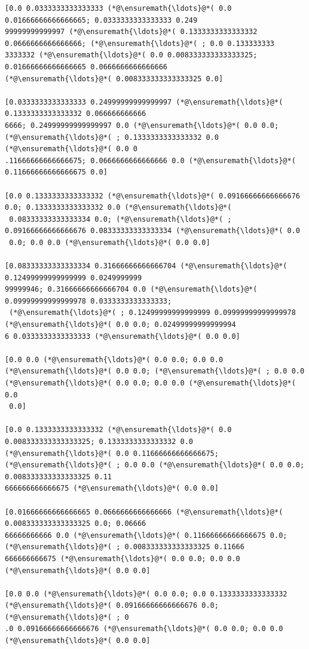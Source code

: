 \documentclass[12pt,a4paper]{article}
\begin{document}
\begin{lstlisting}
[0.0 0.0333333333333333 (*@\ensuremath{\ldots}@*( 0.0 0.01666666666666665; 0.0333333333333333 0.249
99999999999997 (*@\ensuremath{\ldots}@*( 0.1333333333333332 0.0666666666666666; (*@\ensuremath{\ldots}@*( ; 0.0 0.133333333
3333332 (*@\ensuremath{\ldots}@*( 0.0 0.008333333333333325; 0.01666666666666665 0.0666666666666666 
(*@\ensuremath{\ldots}@*( 0.008333333333333325 0.0]

[0.0333333333333333 0.24999999999999997 (*@\ensuremath{\ldots}@*( 0.1333333333333332 0.066666666666
6666; 0.24999999999999997 0.0 (*@\ensuremath{\ldots}@*( 0.0 0.0; (*@\ensuremath{\ldots}@*( ; 0.1333333333333332 0.0 (*@\ensuremath{\ldots}@*( 0.0 0
.11666666666666675; 0.0666666666666666 0.0 (*@\ensuremath{\ldots}@*( 0.11666666666666675 0.0]

[0.0 0.1333333333333332 (*@\ensuremath{\ldots}@*( 0.09166666666666676 0.0; 0.1333333333333332 0.0 (*@\ensuremath{\ldots}@*(
 0.08333333333333334 0.0; (*@\ensuremath{\ldots}@*( ; 0.09166666666666676 0.08333333333333334 (*@\ensuremath{\ldots}@*( 0.0
 0.0; 0.0 0.0 (*@\ensuremath{\ldots}@*( 0.0 0.0]

[0.08333333333333334 0.31666666666666704 (*@\ensuremath{\ldots}@*( 0.12499999999999999 0.0249999999
99999946; 0.31666666666666704 0.0 (*@\ensuremath{\ldots}@*( 0.09999999999999978 0.0333333333333333;
 (*@\ensuremath{\ldots}@*( ; 0.12499999999999999 0.09999999999999978 (*@\ensuremath{\ldots}@*( 0.0 0.0; 0.02499999999999994
6 0.0333333333333333 (*@\ensuremath{\ldots}@*( 0.0 0.0]

[0.0 0.0 (*@\ensuremath{\ldots}@*( 0.0 0.0; 0.0 0.0 (*@\ensuremath{\ldots}@*( 0.0 0.0; (*@\ensuremath{\ldots}@*( ; 0.0 0.0 (*@\ensuremath{\ldots}@*( 0.0 0.0; 0.0 0.0 (*@\ensuremath{\ldots}@*( 0.0
 0.0]

[0.0 0.1333333333333332 (*@\ensuremath{\ldots}@*( 0.0 0.008333333333333325; 0.1333333333333332 0.0 
(*@\ensuremath{\ldots}@*( 0.0 0.11666666666666675; (*@\ensuremath{\ldots}@*( ; 0.0 0.0 (*@\ensuremath{\ldots}@*( 0.0 0.0; 0.008333333333333325 0.11
666666666666675 (*@\ensuremath{\ldots}@*( 0.0 0.0]

[0.01666666666666665 0.0666666666666666 (*@\ensuremath{\ldots}@*( 0.008333333333333325 0.0; 0.06666
66666666666 0.0 (*@\ensuremath{\ldots}@*( 0.11666666666666675 0.0; (*@\ensuremath{\ldots}@*( ; 0.008333333333333325 0.11666
666666666675 (*@\ensuremath{\ldots}@*( 0.0 0.0; 0.0 0.0 (*@\ensuremath{\ldots}@*( 0.0 0.0]

[0.0 0.0 (*@\ensuremath{\ldots}@*( 0.0 0.0; 0.0 0.1333333333333332 (*@\ensuremath{\ldots}@*( 0.09166666666666676 0.0; (*@\ensuremath{\ldots}@*( ; 0
.0 0.09166666666666676 (*@\ensuremath{\ldots}@*( 0.0 0.0; 0.0 0.0 (*@\ensuremath{\ldots}@*( 0.0 0.0]


\end{lstlisting}
\end{document}
